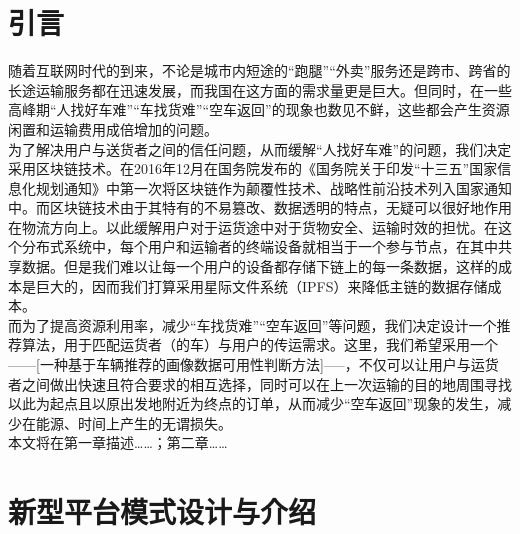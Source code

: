 \documentclass[UTF8]{ctexart}
\begin{document}
\begin{multicols}{2}
  \setcounter{section}{-1}
  \section{引言}
    随着互联网时代的到来，不论是城市内短途的“跑腿”“外卖”服务还是跨市、跨省的长途运输服务都在迅速发展，而我国在这方面的需求量更是巨大。但同时，在一些高峰期“人找好车难”“车找货难”“空车返回”的现象也数见不鲜，这些都会产生资源闲置和运输费用成倍增加的问题。\\
    \indent 为了解决用户与送货者之间的信任问题，从而缓解“人找好车难”的问题，我们决定采用区块链技术。在2016年12月在国务院发布的《国务院关于印发“十三五”国家信息化规划通知》中第一次将区块链作为颠覆性技术、战略性前沿技术列入国家通知中。而区块链技术由于其特有的不易篡改、数据透明的特点，无疑可以很好地作用在物流方向上。以此缓解用户对于运货途中对于货物安全、运输时效的担忧。在这个分布式系统中，每个用户和运输者的终端设备就相当于一个参与节点，在其中共享数据。但是我们难以让每一个用户的设备都存储下链上的每一条数据，这样的成本是巨大的，因而我们打算采用星际文件系统（IPFS）来降低主链的数据存储成本。\\
    \indent 而为了提高资源利用率，减少“车找货难”“空车返回”等问题，我们决定设计一个推荐算法，用于匹配运货者（的车）与用户的传运需求。这里，我们希望采用一个------[一种基于车辆推荐的画像数据可用性判断方法]-----，不仅可以让用户与运货者之间做出快速且符合要求的相互选择，同时可以在上一次运输的目的地周围寻找以此为起点且以原出发地附近为终点的订单，从而减少“空车返回”现象的发生，减少在能源、时间上产生的无谓损失。\\
    \indent 本文将在第一章描述……；第二章……
  \section{新型平台模式设计与介绍}

\end{multicols}
\end{document}
